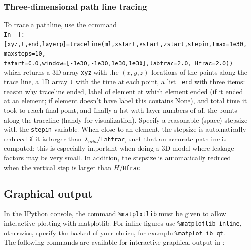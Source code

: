 \documentclass [10pt,letterpaper] {article}
\begin{document}
\subsubsection{Three-dimensional path line tracing}
To trace a pathline, use the command
\\ {\tt In []: [xyz,t,end,layerp]=traceline(ml,xstart,ystart,zstart,stepin,tmax=1e30,maxsteps=10,}
\\   {\tt                           tstart=0.0,window=[-1e30,-1e30,1e30,1e30],labfrac=2.0, Hfrac=2.0))}
\\which returns a 3D array {\tt xyz} with the $(x,y,z)$ locations of the points along
the trace line, a 1D array {\tt t} with the time at each point, a list {\tt
end} with three items: reason why traceline ended, label of
element at which element ended (if it ended at an element; if element doesn't
have label this contains None), and total time it took to reach final point, and
finally a list with layer numbers of all the points along the traceline (handy
for visualization).
Specify a reasonable (space) stepsize with the {\tt stepin} variable. When close to an
element, the stepsize is automatically reduced if it is larger than
$\lambda_{min}/${\tt labfrac}, such that an accurate pathline is computed; this is
especially important when doing a 3D model where leakage factors may be very
small. In addition, the stepsize is automatically reduced when the vertical step is larger than $H$/{\tt Hfrac}.





\subsection{Graphical output}

In the IPython console, the command {\tt \%matplotlib} must be given to allow interactive plotting with matplotlib. For inline figures use {\tt \%matplotlib inline}, otherwise, specify the backed of your choice, for example {\tt \%matplotlib qt}.
\\The following commands are available for interactive graphical output in \Tim:
\end{document}
